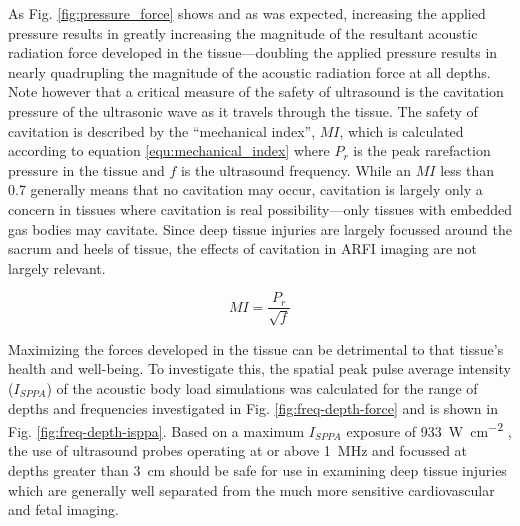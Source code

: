 {			As Fig. \ref{fig:pressure_force} shows and as was expected, increasing the applied pressure results in greatly increasing the magnitude of the resultant acoustic radiation force developed in the tissue---doubling the applied pressure results in nearly quadrupling the magnitude of the acoustic radiation force at all depths. Note however that a critical measure of the safety of ultrasound is the cavitation pressure of the ultrasonic wave as it travels through the tissue. The safety of cavitation is described by the ``mechanical index'', $MI$, which is calculated according to equation \ref{equ:mechanical_index} \cite{hoskins10} where $P_r$ is the peak rarefaction pressure in the tissue and $f$ is the ultrasound frequency. While an $MI$ less than 0.7 generally means that no cavitation may occur, cavitation is largely only a concern in tissues where cavitation is real possibility---only tissues with embedded gas bodies may cavitate. Since deep tissue injuries are largely focussed around the sacrum and heels of tissue, the effects of cavitation in ARFI imaging are not largely relevant.

			\begin{equation}
			\label{equ:mechanical_index}
				MI = \frac{P_r}{\sqrt{f}}
			\end{equation}

			Maximizing the forces developed in the tissue can be detrimental to that tissue's health and well-being. To investigate this, the spatial peak pulse average intensity ($I_{SPPA}$) of the acoustic body load simulations was calculated for the range of depths and frequencies investigated in Fig. \ref{fig:freq-depth-force} and is shown in Fig. \ref{fig:freq-depth-isppa}. Based on a maximum $I_{SPPA}$ exposure of \SI{933}{\W\per\cm\squared} \cite{hoskins10}, the use of ultrasound probes operating at or above \SI{1}{\MHz} and focussed at depths greater than \SI{3}{\cm} should be safe for use in examining deep tissue injuries which are generally well separated from the much more sensitive cardiovascular and fetal imaging.

}
